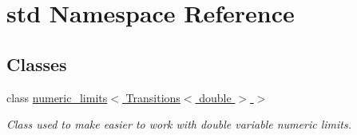 \hypertarget{namespacestd}{\section{std Namespace Reference}
\label{namespacestd}
}
\subsection*{Classes}
\begin{DoxyCompactItemize}
\item 
class \hyperlink{classstd_1_1numeric__limits_3_01Transitions_3_01double_01_4_01_4}{numeric\-\_\-limits$<$ Transitions$<$ double $>$ $>$}
\begin{DoxyCompactList}\small\item\em Class used to make easier to work with double variable numeric limits. \end{DoxyCompactList}\end{DoxyCompactItemize}
